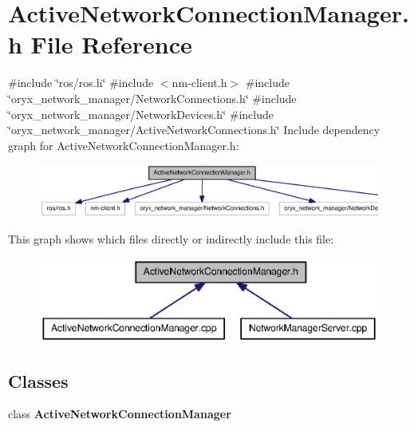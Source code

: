 \section{\-Active\-Network\-Connection\-Manager.\-h \-File \-Reference}
\label{ActiveNetworkConnectionManager_8h}
{\ttfamily \#include \char`\"{}ros/ros.\-h\char`\"{}}\*
{\ttfamily \#include $<$nm-\/client.\-h$>$}\*
{\ttfamily \#include \char`\"{}oryx\-\_\-network\-\_\-manager/\-Network\-Connections.\-h\char`\"{}}\*
{\ttfamily \#include \char`\"{}oryx\-\_\-network\-\_\-manager/\-Network\-Devices.\-h\char`\"{}}\*
{\ttfamily \#include \char`\"{}oryx\-\_\-network\-\_\-manager/\-Active\-Network\-Connections.\-h\char`\"{}}\*
\-Include dependency graph for \-Active\-Network\-Connection\-Manager.\-h\-:
\nopagebreak
\begin{figure}[H]
\begin{center}
\leavevmode
\includegraphics[width=350pt]{ActiveNetworkConnectionManager_8h__incl}
\end{center}
\end{figure}
\-This graph shows which files directly or indirectly include this file\-:
\nopagebreak
\begin{figure}[H]
\begin{center}
\leavevmode
\includegraphics[width=350pt]{ActiveNetworkConnectionManager_8h__dep__incl}
\end{center}
\end{figure}
\subsection*{\-Classes}
\begin{DoxyCompactItemize}
\item 
class {\bf \-Active\-Network\-Connection\-Manager}
\end{DoxyCompactItemize}
